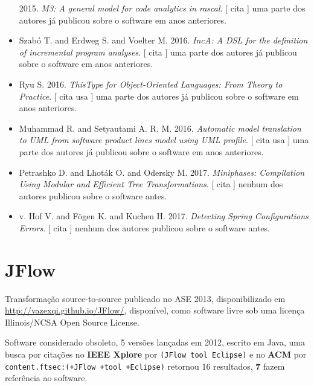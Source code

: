 \begin{itemize}
      2015.
        \textit{ M3: A general model for code analytics in rascal}.
      [
          cita
      ]
uma parte dos autores já publicou sobre o software em anos anteriores.
\item Szabó T. and Erdweg S. and Voelter M.
      2016.
        \textit{ IncA: A DSL for the definition of incremental program analyses}.
      [
          cita
      ]
uma parte dos autores já publicou sobre o software em anos anteriores.
\item Ryu S.
      2016.
        \textit{ ThisType for Object-Oriented Languages: From Theory to Practice}.
      [
          cita
          usa
      ]
uma parte dos autores já publicou sobre o software em anos anteriores.
\item Muhammad R. and Setyautami A. R. M.
      2016.
        \textit{ Automatic model translation to UML from software product lines model using UML profile}.
      [
          cita
          usa
      ]
uma parte dos autores já publicou sobre o software em anos anteriores.
\item Petrashko D. and Lhot\'{a}k O. and Odersky M.
      2017.
        \textit{ Miniphases: Compilation Using Modular and Efficient Tree Transformations}.
      [
          cita
      ]
nenhum dos autores publicou sobre o software antes.
\item v. Hof V. and F\"{o}gen K. and Kuchen H.
      2017.
        \textit{ Detecting Spring Configurations Errors}.
      [
          cita
      ]
nenhum dos autores publicou sobre o software antes.
\end{itemize}
\section{JFlow}

Transformação source-to-source
publicado no ASE 2013,
disponibilizado em \url{http://vazexqi.github.io/JFlow/},
disponível,
como software livre
sob uma licença Illinois/NCSA Open Source License.

Software considerado obsoleto,
5 versões lançadas
em 2012,
escrito em Java,
uma busca por citações no {\bf IEEE Xplore} por
\texttt{(JFlow tool Eclipse)}
e no {\bf ACM} por
\texttt{content.ftsec:(+JFlow +tool +Eclipse)}
retornou
16 resultados,
{\bf 7} fazem referência ao software.


